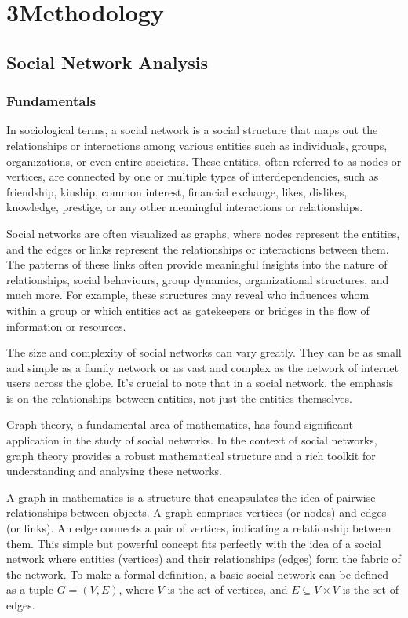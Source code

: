 \chapter{3\quad Methodology}
\label{ch:methods}

\section{Social Network Analysis}
\label{sec:social_networks}

\subsection{Fundamentals}
\label{sec:social_networks_fundamentals}

In sociological terms, a social network is a social structure that maps out the relationships or interactions among various entities such as individuals, groups, organizations, or even entire societies. These entities, often referred to as nodes or vertices, are connected by one or multiple types of interdependencies, such as friendship, kinship, common interest, financial exchange, likes, dislikes, knowledge, prestige, or any other meaningful interactions or relationships.

Social networks are often visualized as graphs, where nodes represent the entities, and the edges or links represent the relationships or interactions between them. The patterns of these links often provide meaningful insights into the nature of relationships, social behaviours, group dynamics, organizational structures, and much more. For example, these structures may reveal who influences whom within a group or which entities act as gatekeepers or bridges in the flow of information or resources.

The size and complexity of social networks can vary greatly. They can be as small and simple as a family network or as vast and complex as the network of internet users across the globe. It's crucial to note that in a social network, the emphasis is on the relationships between entities, not just the entities themselves.

Graph theory, a fundamental area of mathematics, has found significant application in the study of social networks. In the context of social networks, graph theory provides a robust mathematical structure and a rich toolkit for understanding and analysing these networks.

A graph in mathematics is a structure that encapsulates the idea of pairwise relationships between objects. A graph comprises vertices (or nodes) and edges (or links). An edge connects a pair of vertices, indicating a relationship between them. This simple but powerful concept fits perfectly with the idea of a social network where entities (vertices) and their relationships (edges) form the fabric of the network. To make a formal definition, a basic social network can be defined as a tuple $G = (V,E)$, where $V$ is the set of vertices, and $E \subseteq V \times V$ is the set of edges.

